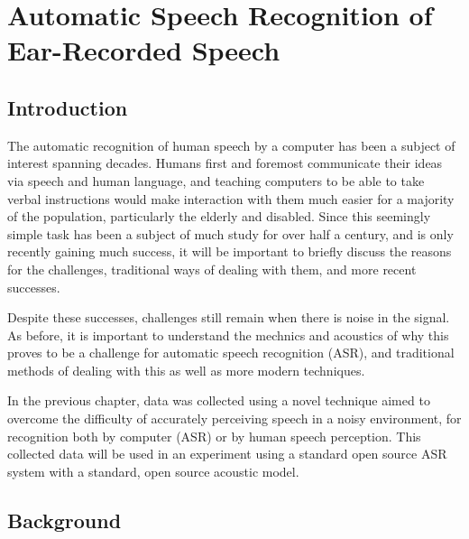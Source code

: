 \documentclass[dissertation,copyright]{uathesis}
\begin{document}



 



\chapter{Automatic Speech Recognition of Ear-Recorded Speech\label{chapter3}}


\section{Introduction}

The automatic recognition of human speech by a computer has been a subject of interest spanning decades.  Humans first and foremost communicate their ideas via speech and human language, and teaching computers to be able to take verbal instructions would make interaction with them much easier for a majority of the population, particularly the elderly and disabled.  Since this seemingly simple task has been a subject of much study for over half a century, and is only recently gaining much success, it will be important to briefly discuss the reasons for the challenges, traditional ways of dealing with them, and more recent successes.

Despite these successes, challenges still remain when there is noise in the signal.  As before, it is important to understand the mechnics and acoustics of why this proves to be a challenge for automatic speech recognition (ASR), and traditional methods of dealing with this as well as more modern techniques.


In the previous chapter, data was collected using a novel technique aimed to overcome the difficulty of accurately perceiving speech in a noisy environment, for recognition both by computer (ASR) or by human speech perception.  This collected data will be used in an experiment using a standard open source ASR system with a standard, open source acoustic model.

\section{Background}
\label{chap3:background}

\end{document}
